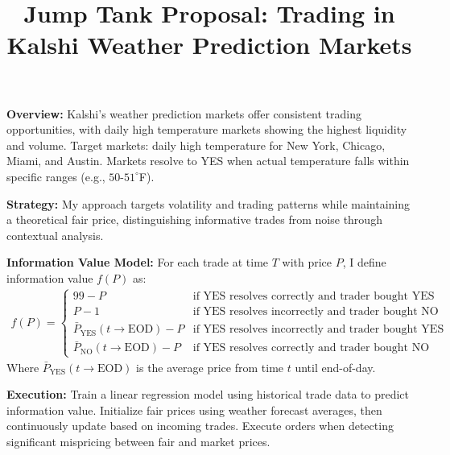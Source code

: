 \documentclass[10pt]{article}
\title{\vspace{-1.1cm}Jump Tank Proposal: Trading in Kalshi Weather Prediction Markets}
\author{}
\date{}
\begin{document}
\maketitle
\vspace{-.5cm}

\noindent\textbf{Overview:} Kalshi's weather prediction markets offer consistent trading opportunities, with daily high temperature markets showing the highest liquidity and volume. Target markets: daily high temperature for New York, Chicago, Miami, and Austin. Markets resolve to YES when actual temperature falls within specific ranges (e.g., $50$-$51^{\circ}$F).

\vspace{0.2cm}
\noindent\textbf{Strategy:} My approach targets volatility and trading patterns while maintaining a theoretical fair price, distinguishing informative trades from noise through contextual analysis.

\noindent\textbf{Information Value Model:} For each trade at time $T$ with price $P$, I define information value $f(P)$ as:
\begin{align*}
f(P) = 
\begin{cases}
99 - P & \text{if YES resolves correctly and trader bought YES} \\
P - 1 & \text{if YES resolves incorrectly and trader bought NO} \\
\bar{P}_{\text{YES}}(t \to \text{EOD}) - P & \text{if YES resolves incorrectly and trader bought YES} \\
\bar{P}_{\text{NO}}(t \to \text{EOD}) - P & \text{if YES resolves correctly and trader bought NO}
\end{cases}
\end{align*}
Where $\bar{P}_{\text{YES}}(t \to \text{EOD})$ is the average price from time $t$ until end-of-day.

\vspace{0.2cm}
\noindent\textbf{Execution:} Train a linear regression model using historical trade data to predict information value. Initialize fair prices using weather forecast averages, then continuously update based on incoming trades. Execute orders when detecting significant mispricing between fair and market prices.
\end{document}

